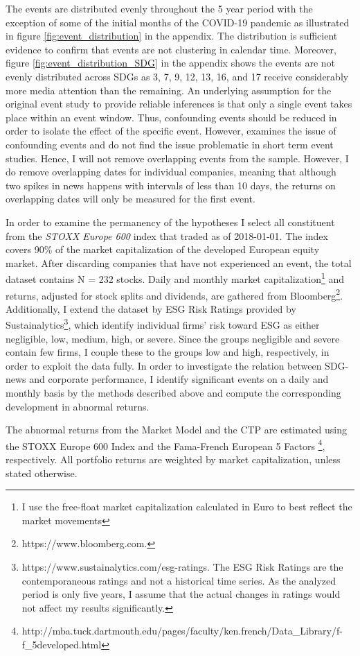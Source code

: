 The events are distributed evenly throughout the 5 year period with the exception of some of the initial months of the COVID-19 pandemic as illustrated in figure \ref{fig:event_distribution} in the appendix. The distribution is sufficient evidence to confirm that events are not clustering in calendar time. Moreover, figure \ref{fig:event_distribution_SDG} in the appendix shows the events are not evenly distributed across SDGs as 3, 7, 9, 12, 13, 16, and 17 receive considerably more media attention than the remaining. An underlying assumption for the original event study to provide reliable inferences is that only a single event takes place within an event window. Thus, confounding events should be reduced in order to isolate the effect of the specific event. However, \cite{sorescu2017event} examines the issue of confounding events and do not find the issue problematic in short term event studies. Hence, I will not remove overlapping events from the sample. However, I do remove overlapping dates for individual companies, meaning that although two spikes in news happens with intervals of less than 10 days, the returns on overlapping dates will only be measured for the first event.   

In order to examine the permanency of the hypotheses I select all constituent from the \textit{STOXX Europe 600} index that traded as of 2018-01-01. The index covers 90\% of the market capitalization of the developed European equity market. After discarding companies that have not experienced an event, the total dataset contains N = 232 stocks. Daily and monthly market capitalization\footnote{I use the free-float market capitalization calculated in Euro to best reflect the market movements} and returns, adjusted for stock splits and dividends, are gathered from Bloomberg\footnote{https://www.bloomberg.com.}. Additionally, I extend the dataset by ESG Risk Ratings provided by Sustainalytics\footnote{https://www.sustainalytics.com/esg-ratings. The ESG Risk Ratings are the contemporaneous ratings and not a historical time series. As the analyzed period is only five years, I assume that the actual changes in ratings would not affect my results significantly.}, which identify individual firms' risk toward ESG as either negligible, low, medium, high, or severe. Since the groups negligible and severe contain few firms, I couple these to the groups low and high, respectively, in order to exploit the data fully.    
In order to investigate the relation between SDG-news and corporate performance, I identify significant events on a daily and monthly basis by the methods described above and compute the corresponding development in abnormal returns. 

The abnormal returns from the Market Model and the CTP are estimated using the STOXX Europe 600 Index and the Fama-French European 5 Factors \footnote{http://mba.tuck.dartmouth.edu/pages/faculty/ken.french/Data\_Library/f-f\_5developed.html}, respectively. All portfolio returns are weighted by market capitalization, unless stated otherwise. 

